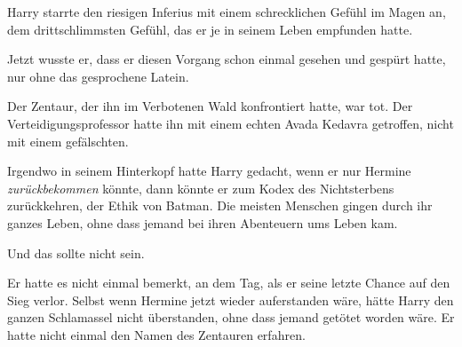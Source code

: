 Harry starrte den riesigen Inferius mit einem schrecklichen Gefühl im Magen an, dem drittschlimmsten Gefühl, das er je in seinem Leben empfunden hatte.

Jetzt wusste er, dass er diesen Vorgang schon einmal gesehen und gespürt hatte, nur ohne das gesprochene Latein.

Der Zentaur, der ihn im Verbotenen Wald konfrontiert hatte, war tot. Der Verteidigungsprofessor hatte ihn mit einem echten Avada Kedavra getroffen, nicht mit einem gefälschten.

Irgendwo in seinem Hinterkopf hatte Harry gedacht, wenn er nur Hermine \emph{zurückbekommen} könnte, dann könnte er zum Kodex des Nichtsterbens zurückkehren, der Ethik von Batman. Die meisten Menschen gingen durch ihr ganzes Leben, ohne dass jemand bei ihren Abenteuern ums Leben kam.

Und das sollte nicht sein.

Er hatte es nicht einmal bemerkt, an dem Tag, als er seine letzte Chance auf den Sieg verlor. Selbst wenn Hermine jetzt wieder auferstanden wäre, hätte Harry den ganzen Schlamassel nicht überstanden, ohne dass jemand getötet worden wäre.
Er hatte nicht einmal den Namen des Zentauren erfahren.

